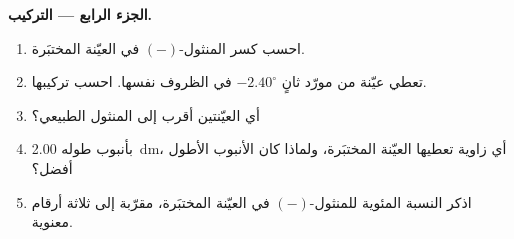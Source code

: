 \begin{problem}
\medskip
\noindent\textbf{الجزء الرابع --- التركيب.}
\begin{enumerate}[resume]
  \item احسب كسر المنثول-$(-)$ في العيّنة المختبَرة.
  \item تعطي عيّنة من مورّد ثانٍ $-2.40^\circ$ في الظروف
        نفسها. احسب تركيبها.
  \item أي العيّنتين أقرب إلى المنثول الطبيعي؟
  \item بأنبوب طوله \qty{2.00}{dm}، أي زاوية تعطيها العيّنة المختبَرة،
        ولماذا كان الأنبوب الأطول أفضل؟
  \item اذكر النسبة المئوية للمنثول-$(-)$ في العيّنة المختبَرة، مقرّبة إلى
        ثلاثة أرقام معنوية.
\end{enumerate}
\end{problem}
